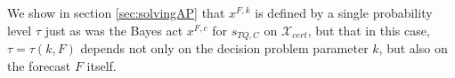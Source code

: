 \documentclass{article}
\begin{document}
We show in section \ref{sec:solvingAP} that $x^{F,k}$ is defined by a single probability level $\tau$ just as was the Bayes act $x^{F,c}$ for $s_{TQ,C}$ on $\mathcal{X}_{cert}$, but that in this case, $\tau = \tau(k, F)$ depends not only on the decision problem 
parameter $k$, but also on the forecast $F$ itself.


\end{document}
